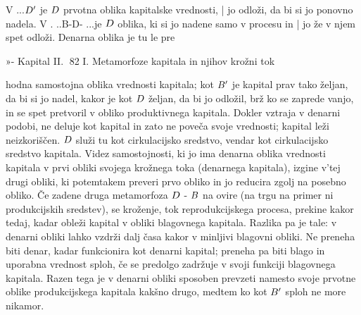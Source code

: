 \documentclass[kapital_02.tex]{subfiles}
\begin{document}
V \KPED...\( D' \) je \( D \) prvotna oblika kapitalske vrednosti, | jo odloži, da bi si jo ponovno nadela. V \KPEP. ..B-D- \KPEB...\KPEP je \( D \) oblika, ki si jo nadene samo v procesu in | jo že v njem spet odloži. Denarna oblika je tu le pre









































































»- Kapital II. 82 I. Metamorfoze kapitala in njihov krožni tok



 hodna samostojna oblika vrednosti kapitala; kot \( B' \) je kapital prav tako željan, da bi si jo nadel, kakor je kot \( D \) željan, da bi jo odložil, brž ko se zaprede vanjo, in se spet pretvoril v obliko produktivnega kapitala. Dokler vztraja v denarni podobi, ne deluje kot kapital in zato ne poveča svoje vrednosti; kapital leži neizkoriščen. \( D \) služi tu kot cirkulacijsko sredstvo, vendar kot cirkulacijsko sredstvo kapitala. Videz samostojnosti, ki jo ima denarna oblika vrednosti kapitala v prvi obliki svojega krožnega toka (denarnega kapitala), izgine v'tej drugi obliki, ki potemtakem preveri prvo obliko in jo reducira zgolj na posebno obliko. Če zadene druga metamorfoza \( D \) - \( B \) na ovire (na trgu na primer ni produkcijskih sredstev), se kroženje, tok reprodukcijskega procesa, prekine kakor tedaj, kadar obleži kapital v obliki blagovnega kapitala. Razlika pa je tale: v denarni obliki lahko vzdrži dalj časa kakor v minljivi blagovni obliki. Ne preneha biti denar, kadar funkcionira kot denarni kapital; preneha pa biti blago in uporabna vrednost sploh, če se predolgo zadržuje v svoji funkciji blagovnega kapitala. Razen tega je v denarni obliki sposoben prevzeti namesto svoje prvotne oblike produkcijskega kapitala kakšno drugo, medtem ko kot \( B' \) sploh ne more nikamor.
\end{document}

